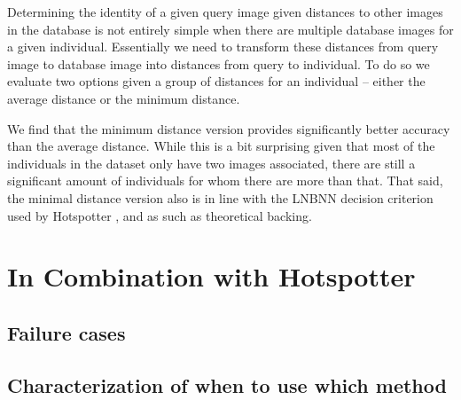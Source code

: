 Determining the identity of a given query image given distances to other images in the database is not entirely simple when there are multiple database images for a given individual.
Essentially we need to transform these distances from query image to database image into distances from query to individual.
To do so we evaluate two options given a group of distances for an individual -- either the average distance or the minimum distance.

We find that the minimum distance version provides significantly better accuracy than the average distance. %
While this is a bit surprising given that most of the individuals in the dataset only have two images associated, there are still a significant amount of individuals for whom there are more than that.
That said, the minimal distance version also is in line with the LNBNN decision criterion used by Hotspotter \cite{crall_hotspotter_2013}, and as such as theoretical backing. %

\section{In Combination with Hotspotter}

\subsection{Failure cases}

\subsection{Characterization of when to use which method}


